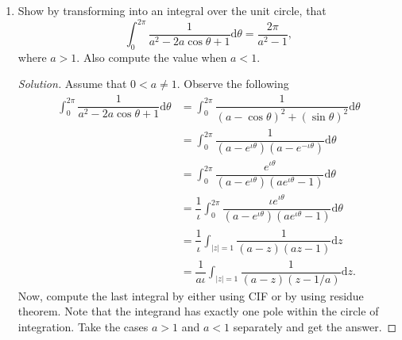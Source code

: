 \documentclass[12pt]{article}
\theoremstyle{definition}
\newenvironment{soln}{\begin{proof}[Solution]}{\end{proof}}
\begin{document}
\begin{enumerate}[leftmargin=*]
\begin{soln}
    	As in the previous question, argue that the second integral goes to $0$ in the limit $R \to 0.$ Also, note that the first integral is exactly what we want, in the limit $R \to \infty.$ (The imaginary part will be zero because odd function.)

    	Thus, only the residue of $f$ at $\iota$ has to be calculated. For this, note that
    	\begin{equation*} 
    		\lim_{z\to \iota}(z - \iota)^2f(z)
    	\end{equation*}
    	exists and is nonzero. Thus, $\iota$ is a pole of order $2.$ Define $g(z) = (z - \iota)^2f(z)$ and compute $\dfrac{1}{2!}g'(\iota).$ This will be the residue.

    	The final answer should come out to be $\boxed{\dfrac{2\pi}{e}}.$
    \end{soln}
    \item Show by transforming into an integral over the unit circle, that
    \begin{equation*} 
    	\int_{0}^{2\pi} \dfrac{1}{a^2 - 2a\cos\theta + 1} {\mathrm{d}}\theta = \dfrac{2\pi}{a^2 - 1},
    \end{equation*}
    where $a > 1.$ Also compute the value when $a < 1.$
    \begin{soln}
    	Assume that $0 < a \neq 1.$ Observe the following
    	\begin{align*} 
    		\int_{0}^{2\pi} \dfrac{1}{a^2 - 2a\cos\theta + 1} {\mathrm{d}}\theta &= \int_{0}^{2\pi} \dfrac{1}{(a - \cos\theta)^2 + (\sin \theta)^2} {\mathrm{d}}\theta\\
    		&= \int_{0}^{2\pi} \dfrac{1}{(a - e^{\iota\theta})(a - e^{-\iota\theta})} {\mathrm{d}}\theta\\
    		&= \int_{0}^{2\pi} \dfrac{e^{\iota\theta}}{(a - e^{\iota\theta})(ae^{\iota\theta} - 1)} {\mathrm{d}}\theta\\
    		&= \dfrac{1}{\iota}\int_{0}^{2\pi} \dfrac{\iota	e^{\iota\theta}}{(a - e^{\iota\theta})(ae^{\iota\theta} - 1)} {\mathrm{d}}\theta\\
    		&= \dfrac{1}{\iota}\int_{|z| = 1}^{} \dfrac{1}{(a - z)(az - 1)} {\mathrm{d}}z\\
    		&= \dfrac{1}{a\iota}\int_{|z| = 1}^{} \dfrac{1}{(a - z)(z - 1/a)} {\mathrm{d}}z.
    	\end{align*}
    	Now, compute the last integral by either using CIF or by using residue theorem. Note that the integrand has exactly one pole within the circle of integration. Take the cases $a > 1$ and $a < 1$ separately and get the answer.

\end{soln}
\end{enumerate}
\end{document}
